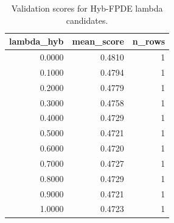 \begin{table}[t]
\caption{Validation scores for Hyb-FPDE lambda candidates.}
\label{tab:lambda_distribution_computed}
\centering
\begin{tabular}{rrr}
\toprule
lambda\_hyb & mean\_score & n\_rows \\
\midrule
0.0000 & 0.4810 & 1 \\
0.1000 & 0.4794 & 1 \\
0.2000 & 0.4779 & 1 \\
0.3000 & 0.4758 & 1 \\
0.4000 & 0.4729 & 1 \\
0.5000 & 0.4721 & 1 \\
0.6000 & 0.4720 & 1 \\
0.7000 & 0.4727 & 1 \\
0.8000 & 0.4729 & 1 \\
0.9000 & 0.4721 & 1 \\
1.0000 & 0.4723 & 1 \\
\bottomrule
\end{tabular}

\end{table}
